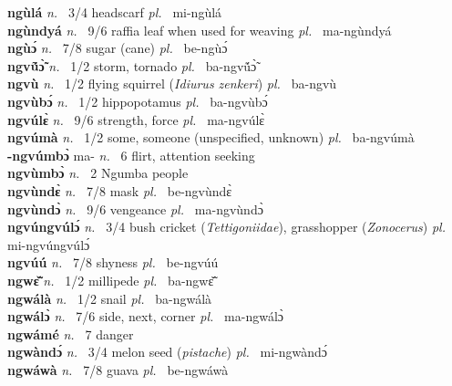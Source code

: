{\bfseries ngùlá}  {\itshape n.~} 3/4 headscarf {\itshape pl.~} mi-ngùlá    \\ 
{\bfseries ngùndyá}  {\itshape n.~} 9/6 raffia leaf when used for weaving {\itshape pl.~} ma-ngùndyá    \\ 
{\bfseries ngùɔ́}  {\itshape n.~} 7/8 sugar (cane) {\itshape pl.~} be-ngùɔ́    \\ 
{\bfseries ngvṹɔ̃̀}  {\itshape n.~} 1/2 storm, tornado {\itshape pl.~} ba-ngvṹɔ̃̀   \\ 
{\bfseries ngvù}  {\itshape n.~} 1/2 flying squirrel ({\itshape Idiurus zenkeri}) {\itshape pl.~} ba-ngvù    \\ 
{\bfseries ngvùbɔ́}  {\itshape n.~} 1/2 hippopotamus {\itshape pl.~} ba-ngvùbɔ́    \\ 
{\bfseries ngvúlɛ̀}  {\itshape n.~} 9/6 strength, force {\itshape pl.~} ma-ngvúlɛ̀    \\ 
{\bfseries ngvúmà}  {\itshape n.~} 1/2 some, someone (unspecified, unknown) {\itshape pl.~} ba-ngvúmà    \\ 
{\bfseries -ngvúmbɔ̀} ma- {\itshape n.~} 6 flirt, attention seeking    \\ 
{\bfseries ngvùmbɔ̀}  {\itshape n.~} 2 Ngumba people \\ 
{\bfseries ngvùndɛ̀}  {\itshape n.~} 7/8 mask {\itshape pl.~} be-ngvùndɛ̀    \\ 
{\bfseries ngvùndɔ̀}  {\itshape n.~} 9/6 vengeance {\itshape pl.~} ma-ngvùndɔ̀    \\ 
{\bfseries ngvúngvúlɔ́}  {\itshape n.~} 3/4 bush cricket ({\itshape Tettigoniidae}), grasshopper ({\itshape Zonocerus}) {\itshape pl.~} mi-ngvúngvúlɔ́    \\ 
{\bfseries ngvúú}  {\itshape n.~} 7/8 shyness {\itshape pl.~} be-ngvúú    \\ 
{\bfseries ngwɛ̃̌}  {\itshape n.~} 1/2 millipede {\itshape pl.~} ba-ngwɛ̃̌    \\ 
{\bfseries ngwálà}  {\itshape n.~} 1/2 snail {\itshape pl.~} ba-ngwálà    \\ 
{\bfseries ngwálɔ̀}  {\itshape n.~} 7/6 side, next, corner {\itshape pl.~} ma-ngwálɔ̀    \\ 
{\bfseries ngwámé}  {\itshape n.~} 7 danger    \\ 
{\bfseries ngwàndɔ́}  {\itshape n.~} 3/4 melon seed ({\itshape pistache}) {\itshape pl.~} mi-ngwàndɔ́    \\ 
{\bfseries ngwáwà}  {\itshape n.~} 7/8 guava {\itshape pl.~} be-ngwáwà    \\ 

